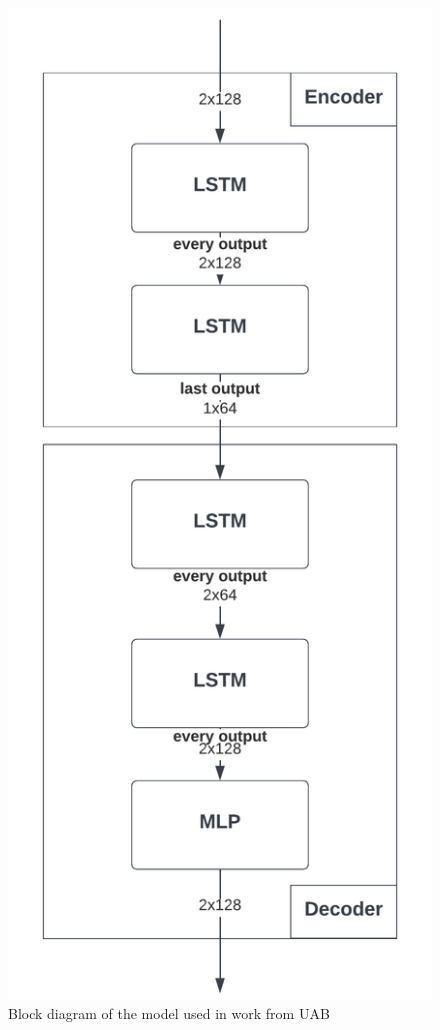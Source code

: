 \begin{figure}[ht]
    \centering
    \includegraphics{images/State-of-art/lstm-autoencoder.png}
    \caption{Block diagram of the model used in work from \gls{UAB}}
    \label{fig:lstm-autoencoder-architecture}
\end{figure}

